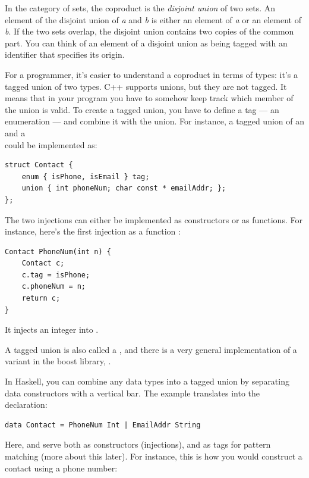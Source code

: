 \noindent
In the category of sets, the coproduct is the \emph{disjoint union} of
two sets. An element of the disjoint union of \emph{a} and \emph{b} is
either an element of \emph{a} or an element of \emph{b}. If the two sets
overlap, the disjoint union contains two copies of the common part. You
can think of an element of a disjoint union as being tagged with an
identifier that specifies its origin.

For a programmer, it's easier to understand a coproduct in terms of
types: it's a tagged union of two types. C++ supports unions, but they
are not tagged. It means that in your program you have to somehow keep
track which member of the union is valid. To create a tagged union, you
have to define a tag --- an enumeration --- and combine it with the
union. For instance, a tagged union of an  and a\\
 could be implemented as:

\begin{verbatim}
struct Contact { 
    enum { isPhone, isEmail } tag;
    union { int phoneNum; char const * emailAddr; };
};
\end{verbatim}

\noindent
The two injections can either be implemented as constructors or as
functions. For instance, here's the first injection as a function
:

\begin{verbatim}
Contact PhoneNum(int n) { 
    Contact c;
    c.tag = isPhone;
    c.phoneNum = n;
    return c;
}
\end{verbatim}

\noindent
It injects an integer into .

A tagged union is also called a , and there is a very
general implementation of a variant in the boost library,
.

In Haskell, you can combine any data types into a tagged union by
separating data constructors with a vertical bar. The 
example translates into the declaration:

\begin{verbatim}
data Contact = PhoneNum Int | EmailAddr String
\end{verbatim}

\noindent
Here,  and  serve both as
constructors (injections), and as tags for pattern matching (more about
this later). For instance, this is how you would construct a contact
using a phone number:

